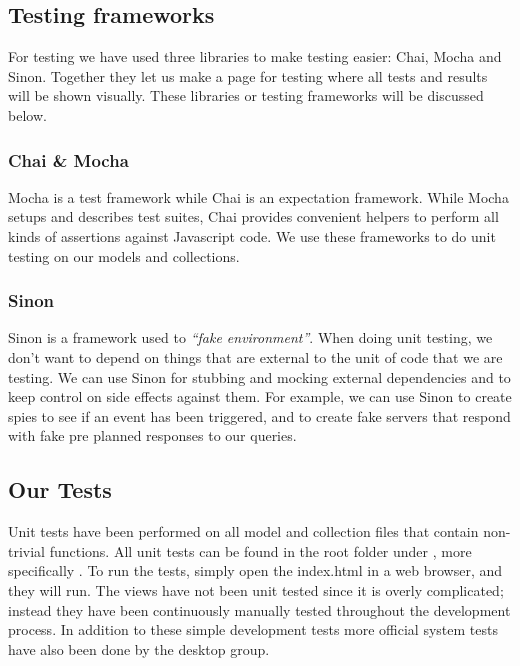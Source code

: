 \subsection{Testing frameworks}
For testing we have used three libraries to make testing easier: Chai, Mocha and Sinon. Together they let us make a page for testing where all tests and results will be shown visually.
These libraries or testing frameworks will be discussed below.
\subsubsection{Chai \& Mocha}
Mocha\cite{web_8} is a test framework while Chai\cite{web_7} is an expectation framework. While Mocha setups and describes test suites, Chai provides convenient helpers to perform all kinds of assertions against Javascript code. We use these frameworks to do unit testing on our models and collections.

\subsubsection{Sinon}
Sinon\cite{web_9} is a framework used to \textit{“fake environment”}. When doing unit testing, we don’t want to depend on things that are external to the unit of code that we are testing. We can use Sinon for stubbing and mocking external dependencies and to keep control on side effects against them. For example, we can use Sinon to create spies to see if an event has been triggered, and to create fake servers that respond with fake pre planned responses to our queries.

\subsection{Our Tests}
Unit tests have been performed on all model and collection files that contain non-trivial functions. All unit tests can be found in the root folder under , more specifically . To run the tests, simply open the index.html in a web browser, and they will run. The views have not been unit tested since it is overly complicated; instead they have been continuously manually tested throughout the development process. In addition to these simple development tests more official system tests have also been done by the desktop group.
